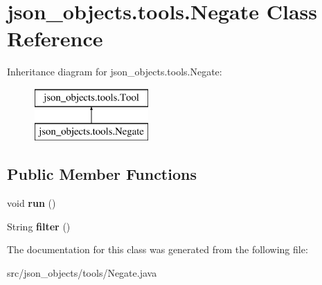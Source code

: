 \hypertarget{classjson__objects_1_1tools_1_1_negate}{
\section{json\_\-objects.tools.Negate Class Reference}
\label{classjson__objects_1_1tools_1_1_negate}
}
Inheritance diagram for json\_\-objects.tools.Negate:\begin{figure}[H]
\begin{center}
\leavevmode
\includegraphics[height=2.000000cm]{classjson__objects_1_1tools_1_1_negate}
\end{center}
\end{figure}
\subsection*{Public Member Functions}
\begin{DoxyCompactItemize}
\item 
\hypertarget{classjson__objects_1_1tools_1_1_negate_a145802026163d4c3d64a8d410e7ec8a0}{
void {\bfseries run} ()}
\label{classjson__objects_1_1tools_1_1_negate_a145802026163d4c3d64a8d410e7ec8a0}

\item 
\hypertarget{classjson__objects_1_1tools_1_1_negate_a0c611d463314c46ac825234895eaaa72}{
String {\bfseries filter} ()}
\label{classjson__objects_1_1tools_1_1_negate_a0c611d463314c46ac825234895eaaa72}

\end{DoxyCompactItemize}


The documentation for this class was generated from the following file:\begin{DoxyCompactItemize}
\item 
src/json\_\-objects/tools/Negate.java\end{DoxyCompactItemize}
